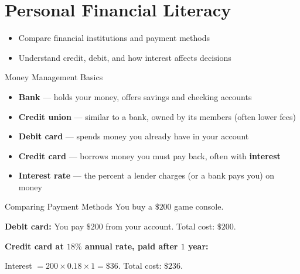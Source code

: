 \section{Personal Financial Literacy}

\begin{learningGoals}
\begin{itemize}
    \item Compare financial institutions and payment methods
    \item Understand credit, debit, and how interest affects decisions
\end{itemize}
\end{learningGoals}

\begin{conceptBox}{Money Management Basics}
\begin{itemize}[leftmargin=*]
    \item \textbf{Bank} --- holds your money, offers savings and checking accounts
    \item \textbf{Credit union} --- similar to a bank, owned by its members (often lower fees)
    \item \textbf{Debit card} --- spends money you already have in your account
    \item \textbf{Credit card} --- borrows money you must pay back, often with \textbf{interest}
    \item \textbf{Interest rate} --- the percent a lender charges (or a bank pays you) on money
\end{itemize}
\end{conceptBox}

\begin{workedExample}{Comparing Payment Methods}
You buy a $\$200$ game console.

\textbf{Debit card:} You pay $\$200$ from your account. Total cost: $\$200$.

\textbf{Credit card at $18\%$ annual rate, paid after $1$ year:}

Interest $= 200 \times 0.18 \times 1 = \$36$. Total cost: $\$236$.
\end{workedExample}



